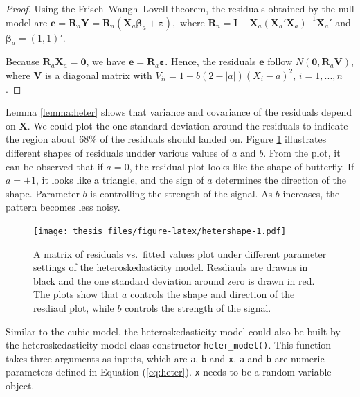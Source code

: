 \documentclass{monashthesis}
\theoremstyle{definition}
\theoremstyle{definition}
\theoremstyle{definition}
\theoremstyle{definition}
\theoremstyle{remark}
\begin{document}
\begin{proof}
Using the Frisch–Waugh–Lovell theorem, the residuals obtained by the null model are $\boldsymbol{e}=\boldsymbol{R}_a\boldsymbol{Y}=\boldsymbol{R}_a(\boldsymbol{X}_a\boldsymbol{\beta}_a+\boldsymbol{\varepsilon}),$ where $\boldsymbol{R}_a=\boldsymbol{I}-\boldsymbol{X}_a(\boldsymbol{X}_a'\boldsymbol{X}_a)^{-1}\boldsymbol{X}_a'$ and $\boldsymbol{\beta}_a=(1,1)'$.

Because $\boldsymbol{R}_a\boldsymbol{X}_a=\boldsymbol{0}$, we have $\boldsymbol{e}=\boldsymbol{R}_a\boldsymbol{\varepsilon}$. Hence, the residuals $\boldsymbol{e}$ follow $N(\boldsymbol{0}, \boldsymbol{R}_a\boldsymbol{V})$, where $\boldsymbol{V}$ is a diagonal matrix with $V_{ii}=1+b(2-|a|)(X_i  -  a)^2$, $i = 1,...,n$. 
\end{proof}

Lemma \ref{lemma:heter} shows that variance and covariance of the residuals depend on \(\boldsymbol{X}\). We could plot the one standard deviation around the residuals to indicate the region about 68\% of the residuals should landed on. Figure \ref{fig:hetershape} illustrates different shapes of residuals undder various values of \(a\) and \(b\). From the plot, it can be observed that if \(a = 0\), the residual plot looks like the shape of butterfly. If \(a = \pm 1\), it looks like a triangle, and the sign of \(a\) determines the direction of the shape. Parameter \(b\) is controlling the strength of the signal. As \(b\) increases, the pattern becomes less noisy.

\begin{figure}
\centering
\texttt{[image: thesis\_files/figure-latex/hetershape-1.pdf]}
\caption{\label{fig:hetershape}A matrix of residuals vs.~fitted values plot under different parameter settings of the heteroskedasticity model. Resdiauls are drawns in black and the one standard deviation around zero is drawn in red. The plots show that \(a\) controls the shape and direction of the resdiaul plot, while \(b\) controls the strength of the signal.}
\end{figure}

Similar to the cubic model, the heteroskedasticity model could also be built by the heteroskedasticity model class constructor \texttt{heter\_model()}. This function takes three arguments as inputs, which are \texttt{a}, \texttt{b} and \texttt{x}. \texttt{a} and \texttt{b} are numeric parameters defined in Equation (\ref{eq:heter}). \texttt{x} needs to be a random variable object.

\begin{Shaded}
\begin{Highlighting}[]
\OtherTok{\textless{}{-}} \NormalTok{(} \NormalTok{, } \NormalTok{, } \NormalTok{(}\SpecialCharTok{{-}}\NormalTok{, }\NormalTok{))}
\end{Highlighting}
\end{Shaded}
\end{document}
